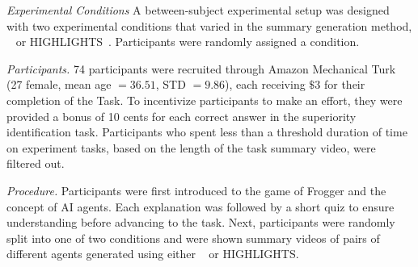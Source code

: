 


\emph{Experimental Conditions}
A between-subject experimental setup was designed with two experimental
conditions that varied in the summary generation method, \disalg~ or
HIGHLIGHTS~\cite{amir18highlights}. Participants were randomly assigned a
condition. 


\emph{Participants.} 74 participants were recruited through Amazon Mechanical
Turk (27 female, mean age $= 36.51$, STD $= 9.86$), each receiving $\$3$ for
their completion of the Task. To incentivize
participants to make an effort, they were provided a bonus of 10 cents for each
correct answer in the superiority identification task.
Participants who spent less than a threshold duration of time on experiment tasks, based on the length of the task summary video, were filtered out.




\emph{Procedure.} Participants were first introduced to the game of Frogger and
the concept of AI agents. Each explanation was followed by a short quiz to
ensure understanding before advancing to the task. Next, participants were
randomly split into one of two conditions and were shown summary videos of pairs
of different agents generated using either \disalg~ or HIGHLIGHTS. 

